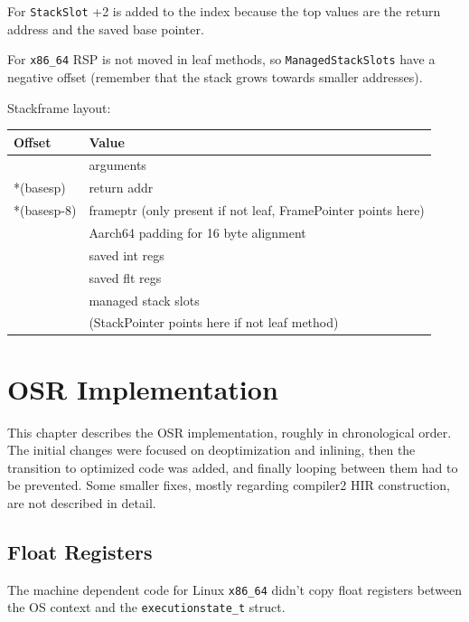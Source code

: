 \documentclass[draft,final]{vutinfth} %
\begin{document}
    For \lstinline{StackSlot} +2 is added to the index because the top values are the return address and the saved base pointer.

    For \texttt{x86\_64} RSP is not moved in leaf methods, so \lstinline{ManagedStackSlots} have a negative offset (remember that the stack grows towards smaller addresses).

    Stackframe layout:

    \begin{tabular}{ll}
        \toprule
        \textbf{Offset} & \textbf{Value}                                                \\
        \midrule
        & arguments \\
        *(basesp)       & return addr                                                   \\
        *(basesp-8)     & frameptr (only present if not leaf, FramePointer points here) \\
        & Aarch64 padding for 16 byte alignment                         \\
        & saved int regs                                                \\
        & saved flt regs                                                \\
        & managed stack slots                                           \\
        & (StackPointer points here if not leaf method)                 \\
        \bottomrule
    \end{tabular}


    \chapter{OSR Implementation}

    This chapter describes the OSR implementation,
    roughly in chronological order.
    The initial changes were focused on deoptimization and inlining,
    then the transition to optimized code was added,
    and finally looping between them had to be prevented.
    Some smaller fixes,
    mostly regarding compiler2 HIR construction,
    are not described in detail.


    \section{Float Registers}

    The machine dependent code for Linux \texttt{x86\_64} didn't copy float registers between the OS context
    and the \lstinline{executionstate_t} struct.
\end{document}
